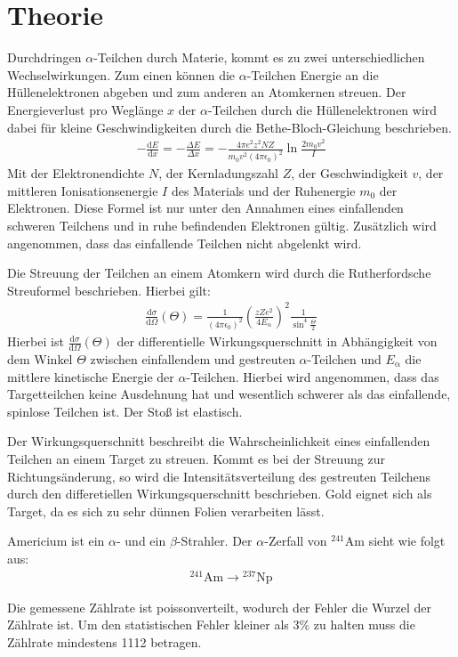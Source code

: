 \section{Theorie}
\label{sec:Theorie}

Durchdringen $\alpha$-Teilchen durch Materie, kommt es zu zwei unterschiedlichen Wechselwirkungen.
Zum einen können die $\alpha$-Teilchen Energie an die Hüllenelektronen abgeben und zum anderen
an Atomkernen streuen. Der Energieverlust pro Weglänge $x$ der $\alpha$-Teilchen durch die Hüllenelektronen wird dabei für
kleine Geschwindigkeiten durch die
Bethe-Bloch-Gleichung beschrieben.
\begin{align}
  -\frac{\mathrm{d}E}{\mathrm{d}x} =-\frac{\Delta E}{\Delta x}= - \frac{4\pi e^2 z^2 N Z}{m_{\mathrm{0}}v^2(4 \pi \epsilon_{\mathrm{0}})^2} \ln{\frac{2 m_{\mathrm{0}} v^2}{I}}
\end{align}
Mit der Elektronendichte $N$, der Kernladungszahl $Z$, der Geschwindigkeit $v$, der mittleren Ionisationsenergie $I$ des Materials
und der Ruhenergie $m_{\mathrm{0}}$ der Elektronen. Diese Formel ist nur unter den Annahmen eines einfallenden
schweren Teilchens und in ruhe befindenden Elektronen gültig. Zusätzlich wird angenommen, dass das einfallende Teilchen nicht
abgelenkt wird.

Die Streuung der Teilchen an einem Atomkern wird durch die Rutherfordsche Streuformel beschrieben. Hierbei gilt:
\begin{align}
  \frac{\mathrm{d}\sigma}{\mathrm{d}\Omega}(\Theta) = \frac{1}{(4 \pi \epsilon_{\mathrm{0}})^2} \left(\frac{z Z e^2}{4 E_{\mathrm{\alpha}}}\right)^2 \frac{1}{\sin^4{\frac{\Theta}{2}}}
  \label{eqn:rutherford}
\end{align}
Hierbei ist $\frac{\mathrm{d}\sigma}{\mathrm{d}\Omega}(\Theta)$ der differentielle Wirkungsquerschnitt in Abhängigkeit von dem Winkel $\Theta$
zwischen einfallendem und gestreuten $\alpha$-Teilchen und
$E_{\mathrm{\alpha}}$ die mittlere kinetische Energie der $\alpha$-Teilchen.
Hierbei wird angenommen, dass das Targetteilchen keine Ausdehnung hat und wesentlich schwerer
als das einfallende, spinlose Teilchen ist. Der Stoß ist elastisch.

Der Wirkungsquerschnitt beschreibt die Wahrscheinlichkeit eines einfallenden Teilchen an
einem Target zu streuen. Kommt es bei der Streuung zur Richtungsänderung, so wird
die Intensitätsverteilung des gestreuten Teilchens durch den differetiellen Wirkungsquerschnitt
beschrieben. Gold eignet sich als Target, da es sich zu sehr dünnen Folien verarbeiten lässt.

Americium ist ein $\alpha$- und ein $\beta$-Strahler. Der $\alpha$-Zerfall von ${}^{241}\mathrm{Am}$ sieht wie folgt aus:
\begin{align*}
  {}^{241}\mathrm{Am} \rightarrow {}^{237}\mathrm{Np}
\end{align*}

Die gemessene Zählrate ist poissonverteilt, wodurch der Fehler die Wurzel der Zählrate ist. Um den
statistischen Fehler kleiner als $3\%$ zu halten muss die Zählrate mindestens 1112 betragen.
